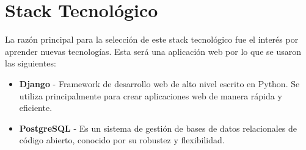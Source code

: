 
\section*{Stack Tecnológico}

La razón principal para la selección de este stack tecnológico fue el interés por aprender nuevas tecnologías. Esta será una aplicación web por lo que se usaron las siguientes:

\begin{itemize}
    \item \textbf{Django} - Framework de desarrollo web de alto nivel escrito en Python. Se utiliza principalmente para crear aplicaciones web de manera rápida y eficiente.
    \item \textbf{PostgreSQL} - Es un sistema de gestión de bases de datos relacionales de código abierto, conocido por su robustez y flexibilidad.
\end{itemize}
